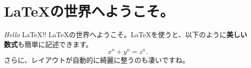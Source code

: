 \documentclass{ltjsarticle}
\begin{document}
\section{\LaTeX の世界へようこそ。}
\textit{Hello} \LaTeX !! \LaTeX の世界へようこそ。\LaTeX を使うと、以下のように\textbf{美しい数式}も簡単に記述できます。
\[x^n + y^n = z^n.\]
さらに、レイアウトが自動的に綺麗に整うのも凄いですね。
\end{document}
